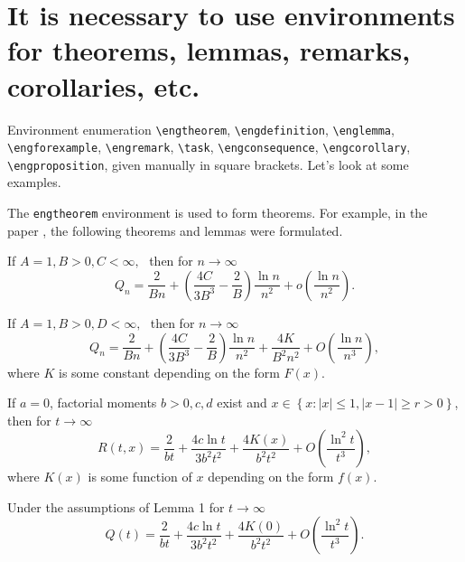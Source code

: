 \documentclass{mfitjournal-en}%
\begin{document}
\section*{It is necessary to use environments for theorems, lemmas, remarks, corollaries, etc.}

Environment enumeration \verb "\engtheorem", \verb "\engdefinition", \verb "\englemma", \verb "\engforexample", \verb "\engremark", \verb "\task", \verb "\engconsequence", \verb"\engcorollary", \verb "\engproposition", given manually in square brackets. Let's look at some examples.

The {\tt engtheorem} environment is used to form theorems.
For example, in the paper \cite{Jur20}, the following theorems and lemmas were formulated.

\begin{engtheorem}[1]
If $ A = 1, B> 0, C <\infty, \, \, $ then for $ n \to \infty $
\[
Q_{n} =\frac{2}{Bn} +\left(\frac{4C}{3B^{3} } -\frac{2}{B} \right)\frac{\ln n}{n^{2} } +o\left(\frac{\ln n}{n^{2} } \right). 
\]
\end{engtheorem}

\begin{engtheorem}[2]
If $ A = 1, B> 0, D <\infty, \, \, $ then for $ n \to \infty $
\[ 
Q_{n} =\frac{2}{Bn} +\left(\frac{4C}{3B^{3} } -\frac{2}{B} \right)\frac{\ln n}{n^{2} } +\frac{4K}{B^{2} n^{2} } +O\left(\frac{\ln n}{n^{3} } \right),  
\]
where $ K $ is some constant depending on the form $ F\left(x\right) $.
\end{engtheorem}

\begin{englemma}[1]
If $ a = 0 $, factorial moments $ b> 0, c, d $ exist and $ x \in \left\{x: \left | x \right | \le 1, \left | x-1 \right | \ge r> 0 \right\} $, then for $ t \to \infty $
\begin{equation}
R(t,x)=\frac{2}{bt} +\frac{4c\ln t}{3b^{2} t^{2} } +\frac{4K(x)}{b^{2} t^{2} } +O\left(\frac{\ln ^{2} t}{t^{3} } \right), 
\end{equation} 
where $ K\left(x\right)$ is some function of $ x $ depending on the form $ f\left(x\right)$.
\end{englemma}

\begin{engconsequence}[1]
Under the assumptions of Lemma 1 for $ t \to \infty $
\begin{equation} 
Q\left(t\right)=\frac{2}{bt} +\frac{4c\ln t}{3b^{2} t^{2} } +\frac{4K(0)}{b^{2} t^{2} } +O\left(\frac{\ln ^{2} t}{t^{3} } \right). 
\end{equation}
\end{engconsequence}
\end{document}
